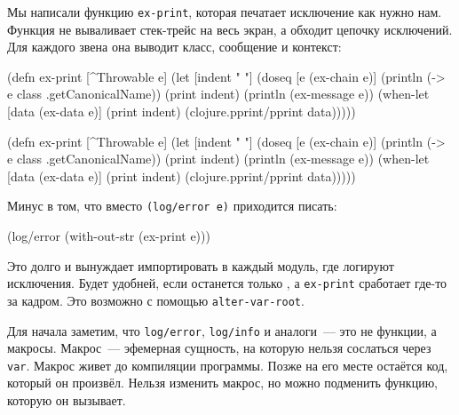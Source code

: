 Мы написали функцию \verb|ex-print|, которая печатает исключение как нужно
нам. Функция не вываливает стек-трейс на весь экран, а обходит цепочку
исключений. Для каждого звена она выводит класс, сообщение и контекст:

\ifnarrow

\begin{english}
  \begin{clojure}
(defn ex-print
  [^Throwable e]
  (let [indent "  "]
    (doseq [e (ex-chain e)]
      (println (-> e
                   class
                   .getCanonicalName))
      (print indent)
      (println (ex-message e))
      (when-let [data (ex-data e)]
        (print indent)
        (clojure.pprint/pprint data)))))
  \end{clojure}
\end{english}

\else

\begin{english}
  \begin{clojure}
(defn ex-print
  [^Throwable e]
  (let [indent "  "]
    (doseq [e (ex-chain e)]
      (println (-> e class .getCanonicalName))
      (print indent)
      (println (ex-message e))
      (when-let [data (ex-data e)]
        (print indent)
        (clojure.pprint/pprint data)))))
  \end{clojure}
\end{english}

\fi

\noindent
Минус в том, что вместо \verb|(log/error e)| приходится писать:

\begin{english}
  \begin{clojure}
(log/error (with-out-str (ex-print e)))
  \end{clojure}
\end{english}

Это долго и вынуждает импортировать  в каждый модуль, где логируют
исключения. Будет удобней, если останется только , а
\verb|ex-print| сработает где-то за кадром. Это возможно с помощью
\texttt{alter-var\--root}.

Для начала заметим, что \verb|log/error|, \verb|log/info| и аналоги~--- это не
функции, а макросы. Макрос~--- эфемерная сущность, на которую нельзя сослаться
через \verb|var|. Макрос живет до компиляции программы. Позже на его месте
остаётся код, который он произвёл. Нельзя изменить макрос, но можно подменить
функцию, которую он вызывает.

